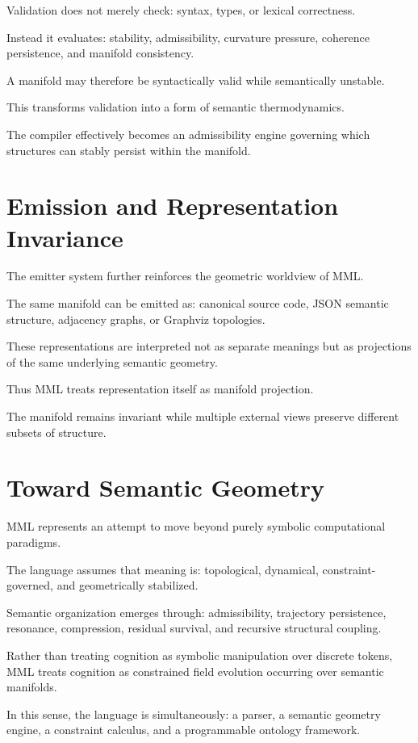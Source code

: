 \documentclass[11pt]{article}
\begin{document}
Validation does not merely check:
syntax,
types,
or lexical correctness.

Instead it evaluates:
stability,
admissibility,
curvature pressure,
coherence persistence,
and manifold consistency.

A manifold may therefore be syntactically valid while semantically unstable.

This transforms validation into a form of semantic thermodynamics.

The compiler effectively becomes an admissibility engine governing which structures can stably persist within the manifold.

\section{Emission and Representation Invariance}

The emitter system further reinforces the geometric worldview of MML.

The same manifold can be emitted as:
canonical source code,
JSON semantic structure,
adjacency graphs,
or Graphviz topologies.

These representations are interpreted not as separate meanings but as projections of the same underlying semantic geometry.

Thus MML treats representation itself as manifold projection.

The manifold remains invariant while multiple external views preserve different subsets of structure.

\section{Toward Semantic Geometry}

MML represents an attempt to move beyond purely symbolic computational paradigms.

The language assumes that meaning is:
topological,
dynamical,
constraint-governed,
and geometrically stabilized.

Semantic organization emerges through:
admissibility,
trajectory persistence,
resonance,
compression,
residual survival,
and recursive structural coupling.

Rather than treating cognition as symbolic manipulation over discrete tokens, MML treats cognition as constrained field evolution occurring over semantic manifolds.

In this sense, the language is simultaneously:
a parser,
a semantic geometry engine,
a constraint calculus,
and a programmable ontology framework.
\end{document}
